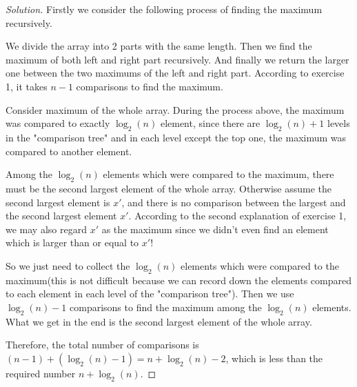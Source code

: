 \begin{proof}[Solution]
    Firstly we consider the following process of finding the maximum recursively.
    
    We divide the array into 2 parts with the same length. Then we find the maximum of both left and right part recursively. And finally we return the larger one between the two maximums of the left and right part. According to exercise 1, it takes $n - 1$ comparisons to find the maximum.
    
    Consider maximum of the whole array. During the process above, the maximum was compared to exactly $\log_2(n)$ element, since there are $\log_2(n) + 1$ levels in the "comparison tree" and in each level except the top one, the maximum was compared to another element.
    
    Among the $\log_2(n)$ elements which were compared to the maximum, there must be the second largest element of the whole array. Otherwise assume the second largest element is $x'$, and there is no comparison between the largest and the second largest element $x'$. According to the second explanation of exercise 1, we may also regard $x'$ as the maximum since we didn't even find an element which is larger than or equal to $x'$!
    
    So we just need to collect the $\log_2(n)$ elements which were compared to the maximum(this is not difficult because we can record down the elements compared to each element in each level of the "comparison tree"). Then we use $\log_2(n) - 1$ comparisons to find the maximum among the $\log_2(n)$ elements. What we get in the end is the second largest element of the whole array.
    
    Therefore, the total number of comparisons is $(n - 1) + (\log_2(n) - 1) = n + \log_2(n) - 2$, which is less than the required number $n + \log_2(n)$.
\end{proof}


